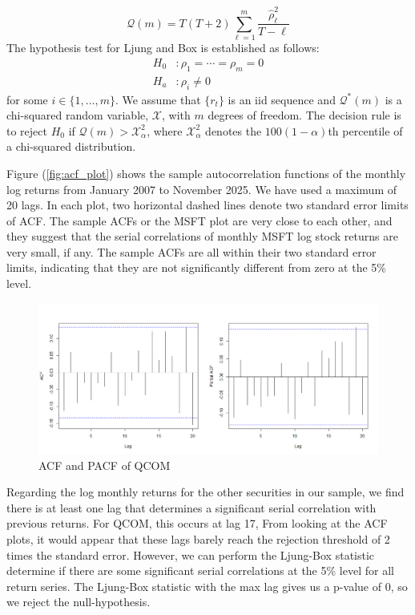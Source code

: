 \documentclass[12pt]{article}
\begin{document}
\begin{equation}
	\mathcal{Q}(m)=T(T+2)\sum_{\ell=1}^{m}\frac{\hat{\rho}_\ell^2}{T-\ell}
\end{equation}
The hypothesis test for Ljung and Box is established as follows:
\[
\begin{aligned}
	H_0&:\rho_1=\cdots=\rho_m=0\\
	H_a&:\rho_i\neq 0
\end{aligned}
\]
for some $i\in\lbrace1,\ldots,m\rbrace$. We assume that $\lbrace r_t\rbrace$ is an iid sequence and $\mathcal{Q}^*(m)$ is a chi-squared random variable, $\mathcal{X}$, with $m$ degrees of freedom. The decision rule is to reject $H_0$ if $\mathcal{Q}(m)>\mathcal{X}^2_\alpha$, where $\mathcal{X}^2_\alpha$ denotes the $100\left(1-\alpha\right)$th percentile of a chi-squared distribution. 

Figure (\ref{fig:acf_plot}) shows the sample autocorrelation functions of the monthly log returns from January 2007 to November 2025. We have used a maximum of 20 lags. In each plot, two horizontal dashed lines denote two standard error limits of ACF. The sample ACFs or the MSFT plot are very close to each other, and they suggest that the serial correlations of monthly MSFT log stock returns are very small, if any. The sample ACFs are all within their two standard error limits, indicating that they are not significantly different from zero at the 5\% level.

\begin{figure}[h]
	\centering
	\includegraphics[width=0.9\linewidth]{plots/qcom_acf_pacf.png}
	\caption{ACF and PACF of QCOM}
	\label{fig:qcom_acf_pacf}
\end{figure}

Regarding the log monthly returns for the other securities in our sample, we find there is at least one lag that determines a significant serial correlation with previous returns. For QCOM, this occurs at lag 17, From looking at the ACF plots, it would appear that these lags barely reach the rejection threshold of 2 times the standard error. However, we can perform the Ljung-Box statistic determine if there are some significant serial correlations at the 5\% level for all return series. The Ljung-Box statistic with the max lag gives us a p-value of 0, so we reject the null-hypothesis.
\end{document}
